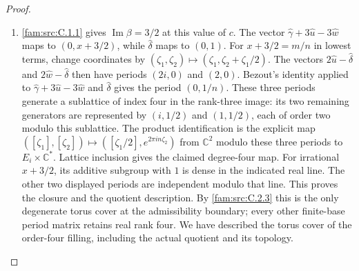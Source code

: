 \begin{proof}
\begin{enumerate}[label=\arabic*.,leftmargin=*]
\item \ref{fam:src:C.1.1} gives \(\operatorname{Im}\beta=3/2\) at this value of \(c\).
The vector \(\widehat\gamma+3\widehat u-3\widehat w\) maps to
\((0,x+3/2)\), while \(\widehat\delta\) maps to \((0,1)\).
For $x+3/2=m/n$ in lowest terms, change coordinates by
$(\zeta_1,\zeta_2)\mapsto(\zeta_1,\zeta_2+\zeta_1/2)$.
The vectors $2\widehat u-\widehat\delta$ and
$2\widehat w-\widehat\delta$ then have periods $(2i,0)$ and $(2,0)$.
Bezout's identity applied to $\widehat\gamma+3\widehat u-3\widehat w$
and $\widehat\delta$ gives the period $(0,1/n)$.
These three periods generate a sublattice of index four in the rank-three
image: its two remaining generators are represented by
$(i,1/2)$ and $(1,1/2)$, each of order two modulo this sublattice.
The product identification is the explicit map
$([\zeta_1],[\zeta_2])\mapsto([\zeta_1/2],e^{2\pi in\zeta_2})$
from $\mathbb C^2$ modulo these three periods to $E_i\times\mathbb C^*$. Lattice inclusion gives the claimed degree-four map.
For irrational $x+3/2$, its additive subgroup with $1$ is dense in the
indicated real line. The other two displayed periods are independent
modulo that line. This proves the closure and the quotient description.
By \ref{fam:src:C.2.3} this is the only degenerate torus cover at the admissibility
boundary; every other finite-base period matrix retains real rank four.
We have described the torus cover of the order-four filling, including
the actual quotient and its topology.
\end{enumerate}
\end{proof}



